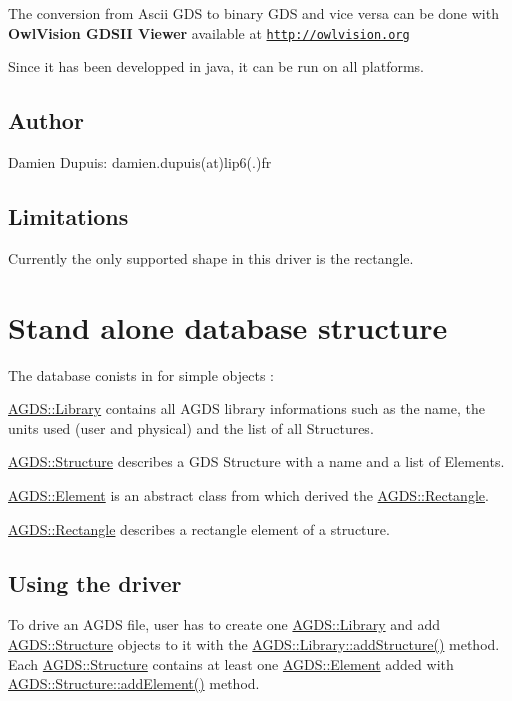 The conversion from Ascii G\-D\-S to binary G\-D\-S and vice versa can be done with {\bfseries Owl\-Vision G\-D\-S\-I\-I Viewer} available at \href{http://owlvision.org}{\tt http\-://owlvision.\-org}\par
Since it has been developped in java, it can be run on all platforms.\hypertarget{agds_agdsAutrhos}{}\subsection{Author}\label{agds_agdsAutrhos}
Damien Dupuis\-: damien.\-dupuis(at)lip6(.)fr\hypertarget{agds_agdsLimits}{}\subsection{Limitations}\label{agds_agdsLimits}
Currently the only supported shape in this driver is the rectangle.\hypertarget{agds_agdsDB}{}\section{Stand alone database structure}\label{agds_agdsDB}
The database conists in for simple objects \-:
\begin{DoxyItemize}
\item \hyperlink{class_a_g_d_s_1_1_library}{A\-G\-D\-S\-::\-Library} contains all A\-G\-D\-S library informations such as the name, the units used (user and physical) and the list of all Structures.
\item \hyperlink{class_a_g_d_s_1_1_structure}{A\-G\-D\-S\-::\-Structure} describes a G\-D\-S Structure with a name and a list of Elements.
\item \hyperlink{class_a_g_d_s_1_1_element}{A\-G\-D\-S\-::\-Element} is an abstract class from which derived the \hyperlink{class_a_g_d_s_1_1_rectangle}{A\-G\-D\-S\-::\-Rectangle}.
\item \hyperlink{class_a_g_d_s_1_1_rectangle}{A\-G\-D\-S\-::\-Rectangle} describes a rectangle element of a structure.
\end{DoxyItemize}\hypertarget{agds_agdsDriver}{}\subsection{Using the driver}\label{agds_agdsDriver}
To drive an A\-G\-D\-S file, user has to create one \hyperlink{class_a_g_d_s_1_1_library}{A\-G\-D\-S\-::\-Library} and add \hyperlink{class_a_g_d_s_1_1_structure}{A\-G\-D\-S\-::\-Structure} objects to it with the \hyperlink{class_a_g_d_s_1_1_library_a93d333a20154e0b688ff3ff213039171}{A\-G\-D\-S\-::\-Library\-::add\-Structure()} method. Each \hyperlink{class_a_g_d_s_1_1_structure}{A\-G\-D\-S\-::\-Structure} contains at least one \hyperlink{class_a_g_d_s_1_1_element}{A\-G\-D\-S\-::\-Element} added with \hyperlink{class_a_g_d_s_1_1_structure_a2dd203e6770f7d15d6f706867c919a60}{A\-G\-D\-S\-::\-Structure\-::add\-Element()} method.\par
